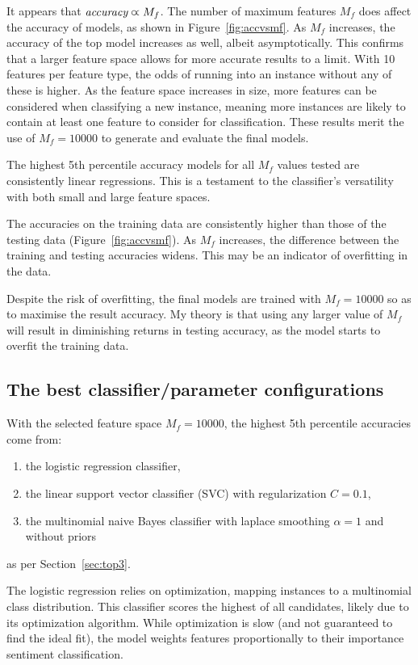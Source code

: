 \documentclass[11pt]{article}
\begin{document}
It appears that $\emph{accuracy} \varpropto M_f$.
The number of maximum features $M_f$ does affect the accuracy of models, as shown in Figure~\ref{fig:accvsmf}.
As $M_f$ increases, the accuracy of the top model increases as well, albeit asymptotically.
This confirms that a larger feature space allows for more accurate results to a limit.
With 10 features per feature type, the odds of running into an instance without any of these is higher. 
As the feature space increases in size, more features can be considered when classifying a new instance, 
meaning more instances are likely to contain at least one feature to consider for classification.
These results merit the use of $M_f = 10000$ to generate and evaluate the final models.

The highest 5th percentile accuracy models for all $M_f$ values tested are consistently linear regressions.
This is a testament to the classifier's versatility with both small and large feature spaces.

The accuracies on the training data are consistently higher than those of the testing data (Figure~\ref{fig:accvsmf}).
As $M_f$ increases, the difference between the training and testing accuracies widens. 
This may be an indicator of overfitting in the data. 

Despite the risk of overfitting, 
the final models are trained with $M_f = 10000$ so as to maximise the result accuracy.
My theory is that using any larger value of $M_f$ will result in diminishing returns in testing accuracy, 
as the model starts to overfit the training data.

\subsection{The best classifier/parameter configurations}\label{sec:bestparams}

With the selected feature space $M_f = 10000$, the highest 5th percentile accuracies come from:
\begin{enumerate}
	\item the logistic regression classifier,
 	\item the linear support vector classifier (SVC) with regularization $C = 0.1$,
  	\item the multinomial naive Bayes classifier with laplace smoothing $\alpha = 1$ and without priors
\end{enumerate}
as per Section~\ref{sec:top3}.

The logistic regression relies on optimization, mapping instances to a multinomial class distribution.
This classifier scores the highest of all candidates, likely due to its optimization algorithm.
While optimization is slow (and not guaranteed to find the ideal fit), 
the model weights features proportionally to their importance sentiment classification.
\end{document}
